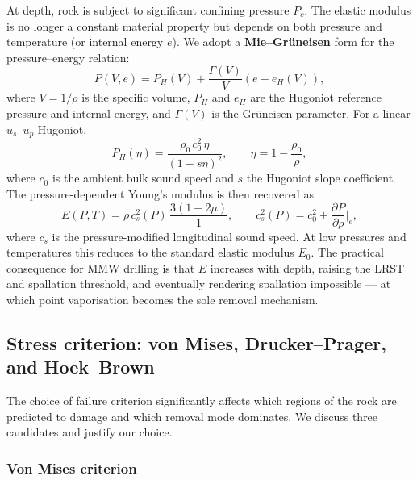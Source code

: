 \documentclass[12pt, a4paper]{article}
\begin{document}
At depth, rock is subject to significant confining pressure $P_c$.  The elastic
modulus is no longer a constant material property but depends on both pressure
and temperature (or internal energy $e$).  We adopt a \textbf{Mie--Gr\"{u}neisen}
form for the pressure--energy relation:
\begin{equation}
    P(V,e) = P_H(V) + \frac{\Gamma(V)}{V}\left(e - e_H(V)\right),
    \label{eq:mie-gruneisen}
\end{equation}
where $V = 1/\rho$ is the specific volume, $P_H$ and $e_H$ are the
Hugoniot reference pressure and internal energy, and $\Gamma(V)$ is the
Gr\"{u}neisen parameter.  For a linear $u_s$--$u_p$ Hugoniot,
\begin{equation}
    P_H(\eta) = \frac{\rho_0\,c_0^2\,\eta}{(1 - s\eta)^2}, \qquad
    \eta = 1 - \frac{\rho_0}{\rho},
    \label{eq:hugoniot}
\end{equation}
where $c_0$ is the ambient bulk sound speed and $s$ the Hugoniot slope
coefficient.  The pressure-dependent Young's modulus is then recovered as
\begin{equation}
    E(P, T) = \rho\,c_s^2(P)\,\frac{3(1-2\mu)}{1},
    \qquad
    c_s^2(P) = c_0^2 + \frac{\partial P}{\partial \rho}\bigg|_e,
    \label{eq:E_EOS}
\end{equation}
where $c_s$ is the pressure-modified longitudinal sound speed.  At low pressures
and temperatures this reduces to the standard elastic modulus $E_0$.  The
practical consequence for MMW drilling is that $E$ increases with depth,
raising the LRST and spallation threshold, and eventually rendering spallation
impossible — at which point vaporisation becomes the sole removal mechanism.

\subsection{Stress criterion: von Mises, Drucker--Prager, and Hoek--Brown}
\label{sec:stress_criterion}

The choice of failure criterion significantly affects which regions of the rock
are predicted to damage and which removal mode dominates.  We discuss three
candidates and justify our choice.

\subsubsection{Von Mises criterion}
\end{document}
